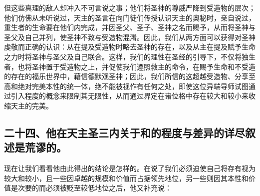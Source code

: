 但这些真理的敌人却冲入不可言说之事；他们将圣神的尊威严降到受造物的层次；他们仿佛从未听说过，天主的圣言在向门徒们传授认识天主的奥秘时，亲自说过，重生者的生命要在他们内完成，并因圣父、圣子、圣神之名而赐予，从而将圣神与圣父及自己并列，使圣神不致与受造物混淆。因此，我们从两方面可以获得对圣神虔敬而正确的认识：从在提及受造物时略去圣神的存在，以及从主在提及赋予生命之力时将圣神与圣父及自己联合。这样，我们的理性在圣经的引导下，不仅将独生者，也将圣神置于受造物之上，并促使我们遵照救主的命令，在赐予生命和不受造的存在的福乐世界中，藉信德默观圣神；因此，我们所信的这超越受造物、分享至高和绝对完美本性的统一体，绝不能被视作有任何之处，即使这位异端导师试图通过引入程度的概念来限制其无限性，从而通过界定在诸位格中存在较大和较小来收缩天主的完美。\par


\subsection{二十四、他在天主圣三内关于和的程度与差异的详尽叙述是荒谬的。}

现在让我们看看他由此得出的结论是怎样的。在说了我们必须迫使自己将存有视为较大和较小，且一些因卓越的规模和价值而占据领先地位，另一些则因其本性和价值是次要的而必须被贬至较低地位之后，他又补充说：\par

